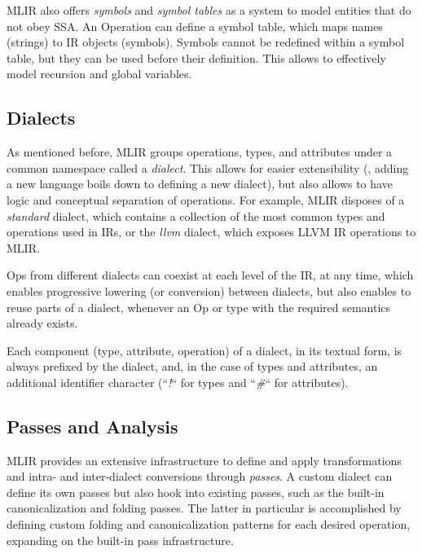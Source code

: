 MLIR also offers \textit{symbols} and \textit{symbol tables} as a system to model entities that do not obey SSA. An Operation can define a symbol table, which maps names (strings) to IR objects (symbols). Symbols cannot be redefined within a symbol table, but they can be used before their definition. This allows to effectively model recursion and global variables.


\subsection{Dialects}
As mentioned before, MLIR groups operations, types, and attributes under a common namespace called a \textit{dialect}. This allows for easier extensibility (\ie, adding a new language boils down to defining a new dialect), but also allows to have logic and conceptual separation of operations. For example, MLIR disposes of a \textit{standard} dialect, which contains a collection of the most common types and operations used in IRs, or the \textit{llvm} dialect, which exposes LLVM IR operations to MLIR.

Ops from different dialects can coexist at each level of the IR, at any time, which enables progressive lowering (or conversion) between dialects, but also enables to reuse parts of a dialect, whenever an Op or type with the required semantics already exists.

Each component (type, attribute, operation) of a dialect, in its textual form, is always prefixed by the dialect, and, in the case of types and attributes, an additional identifier character (“\textit{!}“ for types and “\textit{\#}“ for attributes).


\subsection{Passes and Analysis}
\label{sec:pass}
MLIR provides an extensive infrastructure to define and apply transformations and intra- and inter-dialect conversions through \textit{passes}. A custom dialect can define its own passes but also hook into existing passes, such as the built-in canonicalization and folding passes. The latter in particular is accomplished by defining custom folding and canonicalization patterns for each desired operation, expanding on the built-in pass infrastructure.

